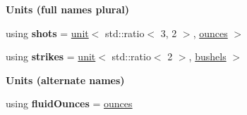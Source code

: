 \begin{Indent}{\bf Units (full names plural)}
\begin{DoxyCompactItemize}
\item 
\hypertarget{namespaceunits_1_1volume_a24d85a06188b210f6194c6e4dddb9e4f}{}using {\bfseries shots} = \hyperlink{structunits_1_1unit}{unit}$<$ std\+::ratio$<$ 3, 2 $>$, \hyperlink{structunits_1_1unit}{ounces} $>$\label{namespaceunits_1_1volume_a24d85a06188b210f6194c6e4dddb9e4f}

\item 
\hypertarget{namespaceunits_1_1volume_aa478ea8cbdfb0cd992e8029886807b8a}{}using {\bfseries strikes} = \hyperlink{structunits_1_1unit}{unit}$<$ std\+::ratio$<$ 2 $>$, \hyperlink{structunits_1_1unit}{bushels} $>$\label{namespaceunits_1_1volume_aa478ea8cbdfb0cd992e8029886807b8a}

\end{DoxyCompactItemize}
\end{Indent}
\begin{Indent}{\bf Units (alternate names)}\par
\begin{DoxyCompactItemize}
\item 
\hypertarget{namespaceunits_1_1volume_a6ff3b31e3163494a5b7144872e9b7f20}{}using {\bfseries fluid\+Ounces} = \hyperlink{structunits_1_1unit}{ounces}\label{namespaceunits_1_1volume_a6ff3b31e3163494a5b7144872e9b7f20}

\end{DoxyCompactItemize}
\end{Indent}

